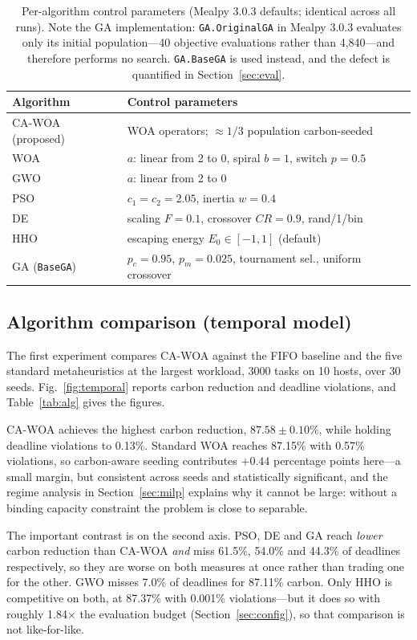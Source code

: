\documentclass[12pt,a4paper]{article}
\begin{document}
\begin{table}[H]\centering \footnotesize
\caption{Per-algorithm control parameters (Mealpy 3.0.3 defaults; identical across all runs). Note the GA
implementation: \texttt{GA.OriginalGA} in Mealpy 3.0.3 evaluates only its initial population---40 objective
evaluations rather than 4{,}840---and therefore performs no search. \texttt{GA.BaseGA} is used instead, and
the defect is quantified in Section~\ref{sec:eval}.}\label{tab:hyper}
\begin{tabular}{@{}ll@{}}
\toprule Algorithm & Control parameters \\ \midrule
CA-WOA (proposed) & WOA operators; $\approx\!1/3$ population carbon-seeded \\
WOA & $a$: linear from 2 to 0, spiral $b=1$, switch $p=0.5$ \\
GWO & $a$: linear from 2 to 0 \\
PSO & $c_1=c_2=2.05$, inertia $w=0.4$ \\
DE & scaling $F=0.1$, crossover $CR=0.9$, rand/1/bin \\
HHO & escaping energy $E_0\in[-1,1]$ (default) \\
GA (\texttt{BaseGA}) & $p_c=0.95$, $p_m=0.025$, tournament sel., uniform crossover \\
\bottomrule
\end{tabular}
\end{table}

\subsection{Algorithm comparison (temporal model)}
The first experiment compares CA-WOA against the FIFO baseline and the five standard metaheuristics at the
largest workload, 3000 tasks on 10 hosts, over 30 seeds. Fig.~\ref{fig:temporal} reports carbon reduction and
deadline violations, and Table~\ref{tab:alg} gives the figures.

CA-WOA achieves the highest carbon reduction, $87.58 \pm 0.10$\%, while holding deadline violations to
0.13\%. Standard WOA reaches 87.15\% with 0.57\% violations, so carbon-aware seeding contributes $+0.44$
percentage points here---a small margin, but consistent across seeds and statistically significant, and the
regime analysis in Section~\ref{sec:milp} explains why it cannot be large: without a binding capacity
constraint the problem is close to separable.

The important contrast is on the second axis. PSO, DE and GA reach \emph{lower} carbon reduction than CA-WOA
\emph{and} miss 61.5\%, 54.0\% and 44.3\% of deadlines respectively, so they are worse on both measures at
once rather than trading one for the other. GWO misses 7.0\% of deadlines for 87.11\% carbon. Only HHO is
competitive on both, at 87.37\% with 0.001\% violations---but it does so with roughly 1.84$\times$ the
evaluation budget (Section~\ref{sec:config}), so that comparison is not like-for-like.
\end{document}
